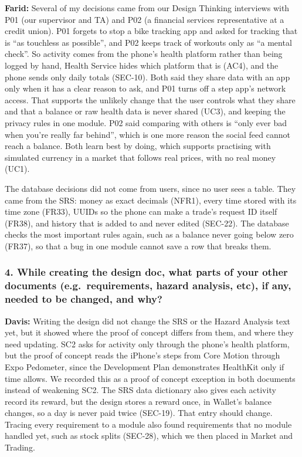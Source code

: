 \documentclass[12pt, titlepage]{article}
\begin{document}
\noindent\textbf{Farid:} Several of my decisions came from our Design
Thinking interviews with P01 (our supervisor and TA) and P02 (a financial
services representative at a credit union). P01 forgets to stop a bike
tracking app and asked for tracking that is ``as touchless as possible'', and
P02 keeps track of workouts only as ``a mental check''. So activity comes from
the phone's health platform rather than being logged by hand, Health Service
hides which platform that is (AC4), and the phone sends only daily totals
(SEC-10). Both said they share data with an app only when it has a clear reason
to ask, and P01 turns off a step app's network access. That supports the
unlikely change that the user controls what they share and that a balance or
raw health data is never shared (UC3), and keeping the privacy rules in one
module. P02 said comparing with others is ``only ever bad when you're
really far behind'', which is one more reason the social feed cannot reach a
balance. Both learn best by doing, which supports practising with simulated
currency in a market that follows real prices, with no real money (UC1).

The database decisions did not come from users, since no user sees a table.
They came from the SRS: money as exact decimals (NFR1), every time stored with
its time zone (FR33), UUIDs so the phone can make a trade's request ID itself
(FR38), and history that is added to and never edited (SEC-22). The database
checks the most important rules again, such as a balance never going below
zero (FR37), so that a bug in one module cannot save a row that breaks them.

\subsubsection*{4. While creating the design doc, what parts of your other
documents (e.g.\ requirements, hazard analysis, etc), if any, needed to be
changed, and why?}

\noindent\textbf{Davis:} Writing the design did not change the SRS or the
Hazard Analysis text yet, but it showed where the proof of concept differs from
them, and where they need updating. SC2 asks for activity only through the
phone's health platform, but the proof of concept reads the iPhone's steps from
Core Motion through Expo Pedometer, since the Development Plan demonstrates
HealthKit only if time allows. We recorded this as a proof of concept exception
in both documents instead of weakening SC2. The SRS data dictionary also gives
each activity record its reward, but the design stores a reward once, in
Wallet's balance changes, so a day is never paid twice (SEC-19). That entry
should change. Tracing every requirement to a module also found requirements
that no module handled yet, such as stock splits (SEC-28), which we then placed
in Market and Trading.\\
\end{document}
